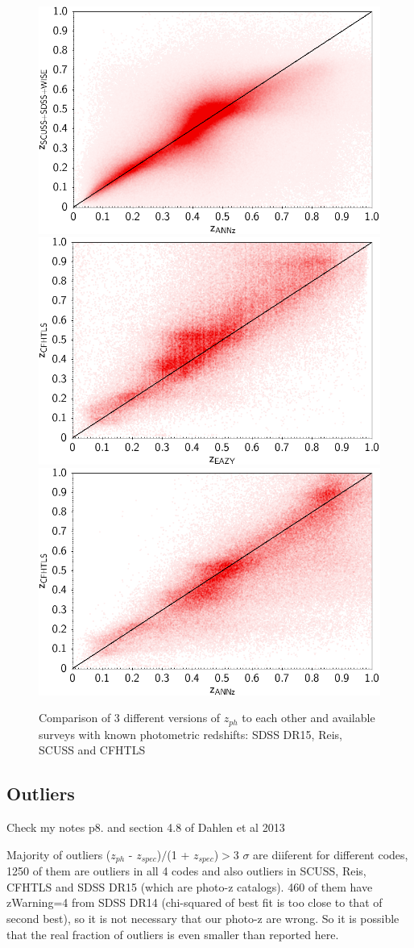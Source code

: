 \documentclass[apj,iop]{emulateapj}
\begin{document}
\begin{figure}[!ht]
\includegraphics[width=0.45\linewidth]{figures/photoz/annz_scuss.png}
\newline
\includegraphics[width=0.45\linewidth]{figures/photoz/eazy_cfhtls.png}
\includegraphics[width=0.45\linewidth]{figures/photoz/annz_cfhtls.png}
\newline
\caption{Comparison of 3 different versions of $z_{ph}$ to each other and available surveys with known photometric redshifts: SDSS DR15, Reis, SCUSS and CFHTLS}
\label{fig:photoz}
\end{figure}

\subsection{Outliers}
Check my notes p8. and section 4.8 of Dahlen et al 2013

Majority of outliers ($ z_{ph} $ - $ z_{spec} $)$/$(1 + $ z_{spec} $)$>$3 $\sigma$ are diiferent for different codes, 1250 of them are outliers in all 4 codes and also outliers in SCUSS, Reis, CFHTLS and SDSS DR15 (which are photo-z catalogs).
460 of them have zWarning=4 from SDSS DR14 (chi-squared of best fit is too close to that of second best), so it is not necessary that our photo-z are wrong. So it is possible that the real fraction of outliers is even smaller than reported here.
\end{document}
